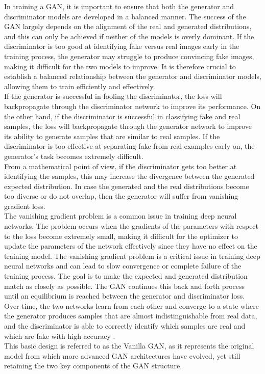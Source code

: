 \noindent In training a GAN, it is important to ensure that both the generator and discriminator models are developed in a balanced manner. The success of the GAN largely depends on the alignment of the real and generated distributions, and this can only be achieved if neither of the models is overly dominant. If the discriminator is too good at identifying fake versus real images early in the training process, the generator may struggle to produce convincing fake images, making it difficult for the two models to improve. It is therefore crucial to establish a balanced relationship between the generator and discriminator models, allowing them to train efficiently and effectively.\\
If the generator is successful in fooling the discriminator, the loss will backpropagate through the discriminator network to improve its performance. On the other hand, if the discriminator is successful in classifying fake and real samples, the loss will backpropagate through the generator network to improve its ability to generate samples that are similar to real samples. If the discriminator is too effective at separating fake from real examples early on, the generator's task becomes extremely difficult. \\ 
From a mathematical point of view, if the discriminator gets too better at identifying the samples, this may increase the divergence between the generated expected distribution. In case the generated and the real distributions become too diverse or do not overlap, then the generator will suffer from vanishing gradient loss. \\
The vanishing gradient problem is a common issue in training deep neural networks. The problem occurs when the gradients of the parameters with respect to the loss become extremely small, making it difficult for the optimizer to update the parameters of the network effectively since they have no effect on the training model. The vanishing gradient problem is a critical issue in training deep neural networks and can lead to slow convergence or complete failure of the training process. The goal is to make the expected and generated distribution match as closely as possible. 
The GAN continues this back and forth process until an equilibrium is reached between the generator and discriminator loss. Over time, the two networks learn from each other and converge to a state where the generator produces samples that are almost indistinguishable from real data, and the discriminator is able to correctly identify which samples are real and which are fake with high accuracy \cite{GANGoodfellow, GeneratingNewRealityBook}.
 \\
This basic design is referred to as the Vanilla GAN, as it represents the original model from which more advanced GAN architectures have evolved, yet still retaining the two key components of the GAN structure.


